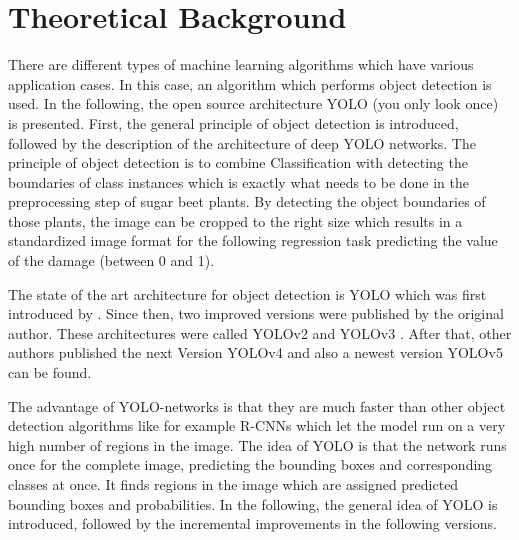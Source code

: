 
\chapter{Theoretical Background}

There are different types of machine learning algorithms which have various application cases. In this case, an algorithm which performs object detection is used. In the following, the open source architecture YOLO (you only look once) is presented. First, the general principle of object detection is introduced, followed by the description of the architecture of deep YOLO networks. The principle of object detection is to combine Classification with detecting the boundaries of class instances which is exactly what needs to be done in the preprocessing step of sugar beet plants. By detecting the object boundaries of those plants, the image can be cropped to the right size which results in a standardized image format for the following regression task predicting the value of the damage (between 0 and 1).

The state of the art architecture for object detection is YOLO which was first introduced by \cite{yolov1}. Since then, two improved versions were published by the original author. These architectures were called YOLOv2 \cite{yolov2} and YOLOv3 \cite{yolov3}. After that, other authors published the next Version YOLOv4 \cite{yolov4} and also a newest version YOLOv5 can be found. 

The advantage of YOLO-networks is that they are much faster than other object detection algorithms like for example R-CNNs \cite{RCNN} which let the model run on a very high number of regions in the image. The idea of YOLO is that the network runs once for the complete image, predicting the bounding boxes and corresponding classes at once. It finds regions in the image which are assigned predicted bounding boxes and probabilities. In the following, the general idea of YOLO is introduced, followed by the incremental improvements in the following versions. 

